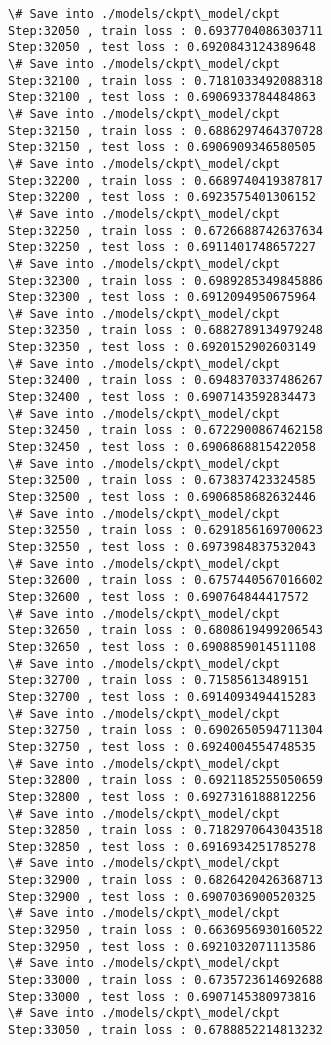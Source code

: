 \documentclass[11pt]{article}
\begin{document}
\begin{Verbatim}[commandchars=\\\{\}]
\# Save into ./models/ckpt\_model/ckpt
Step:32050 , train loss : 0.6937704086303711
Step:32050 , test loss : 0.6920843124389648
\# Save into ./models/ckpt\_model/ckpt
Step:32100 , train loss : 0.7181033492088318
Step:32100 , test loss : 0.6906933784484863
\# Save into ./models/ckpt\_model/ckpt
Step:32150 , train loss : 0.6886297464370728
Step:32150 , test loss : 0.6906909346580505
\# Save into ./models/ckpt\_model/ckpt
Step:32200 , train loss : 0.6689740419387817
Step:32200 , test loss : 0.6923575401306152
\# Save into ./models/ckpt\_model/ckpt
Step:32250 , train loss : 0.6726688742637634
Step:32250 , test loss : 0.6911401748657227
\# Save into ./models/ckpt\_model/ckpt
Step:32300 , train loss : 0.6989285349845886
Step:32300 , test loss : 0.6912094950675964
\# Save into ./models/ckpt\_model/ckpt
Step:32350 , train loss : 0.6882789134979248
Step:32350 , test loss : 0.6920152902603149
\# Save into ./models/ckpt\_model/ckpt
Step:32400 , train loss : 0.6948370337486267
Step:32400 , test loss : 0.6907143592834473
\# Save into ./models/ckpt\_model/ckpt
Step:32450 , train loss : 0.6722900867462158
Step:32450 , test loss : 0.6906868815422058
\# Save into ./models/ckpt\_model/ckpt
Step:32500 , train loss : 0.673837423324585
Step:32500 , test loss : 0.6906858682632446
\# Save into ./models/ckpt\_model/ckpt
Step:32550 , train loss : 0.6291856169700623
Step:32550 , test loss : 0.6973984837532043
\# Save into ./models/ckpt\_model/ckpt
Step:32600 , train loss : 0.6757440567016602
Step:32600 , test loss : 0.690764844417572
\# Save into ./models/ckpt\_model/ckpt
Step:32650 , train loss : 0.6808619499206543
Step:32650 , test loss : 0.6908859014511108
\# Save into ./models/ckpt\_model/ckpt
Step:32700 , train loss : 0.71585613489151
Step:32700 , test loss : 0.6914093494415283
\# Save into ./models/ckpt\_model/ckpt
Step:32750 , train loss : 0.6902650594711304
Step:32750 , test loss : 0.6924004554748535
\# Save into ./models/ckpt\_model/ckpt
Step:32800 , train loss : 0.6921185255050659
Step:32800 , test loss : 0.6927316188812256
\# Save into ./models/ckpt\_model/ckpt
Step:32850 , train loss : 0.7182970643043518
Step:32850 , test loss : 0.6916934251785278
\# Save into ./models/ckpt\_model/ckpt
Step:32900 , train loss : 0.6826420426368713
Step:32900 , test loss : 0.6907036900520325
\# Save into ./models/ckpt\_model/ckpt
Step:32950 , train loss : 0.6636956930160522
Step:32950 , test loss : 0.6921032071113586
\# Save into ./models/ckpt\_model/ckpt
Step:33000 , train loss : 0.6735723614692688
Step:33000 , test loss : 0.6907145380973816
\# Save into ./models/ckpt\_model/ckpt
Step:33050 , train loss : 0.6788852214813232

\end{Verbatim}
\end{document}
